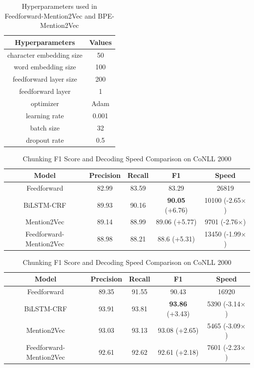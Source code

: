 \begin{table}[h]
\centering
\caption{Hyperparameters used in Feedforward-Mention2Vec and BPE-Mention2Vec}
\label{table:hyperparameters3}
\begin{tabular}{|c|c|}
\hline
Hyperparameters & Values \\ \hline
character embedding size & 50 \\ \hline
word embedding size & 100 \\ \hline
feedforward layer size & 200 \\ \hline
feedforward layer & 1 \\ \hline
optimizer & Adam \\ \hline
learning rate & 0.001 \\ \hline
batch size & 32 \\ \hline
dropout rate & 0.5 \\ \hline
\end{tabular}
\end{table}

\begin{table}[h]
\centering
\caption{NER F1 Score and Decoding Speed Comparison on CoNLL 2003}
\label{table:ner-mention2vec1}
\begin{tabular}{|c|c|c|c|c|}
\hline
Model   & Precision & Recall & F1 & Speed \\ \hline
Feedforward &82.99 &83.59 &83.29 & 26819 \\ \hline
BiLSTM-CRF &89.93 &90.16 &\textbf{90.05} (+6.76) & 10100 (-2.65$\times$) \\ \hline
Mention2Vec &89.14 &88.99 &89.06 (+5.77) & 9701 (-2.76$\times$) \\ \hline
Feedforward-Mention2Vec &88.98 &88.21 &88.6 (+5.31) & 13450 (-1.99$\times$) \\ \hline
\end{tabular}
\bigskip
\caption{Chunking F1 Score and Decoding Speed Comparison on CoNLL 2000}
\label{table:chunk-mention2vec1}
\begin{tabular}{|c|c|c|c|c|}
\hline
Model   & Precision & Recall & F1 & Speed \\ \hline
Feedforward & 89.35 &91.55 &90.43 & 16920 \\ \hline
BiLSTM-CRF &93.91 &93.81 &\textbf{93.86} (+3.43) & 5390 (-3.14$\times$) \\ \hline
Mention2Vec &93.03 & 93.13 &93.08 (+2.65) & 5465 (-3.09$\times$) \\ \hline
Feedforward-Mention2Vec &92.61 & 92.62 &92.61 (+2.18) & 7601 (-2.23$\times$) \\ \hline
\end{tabular}
\end{table}

